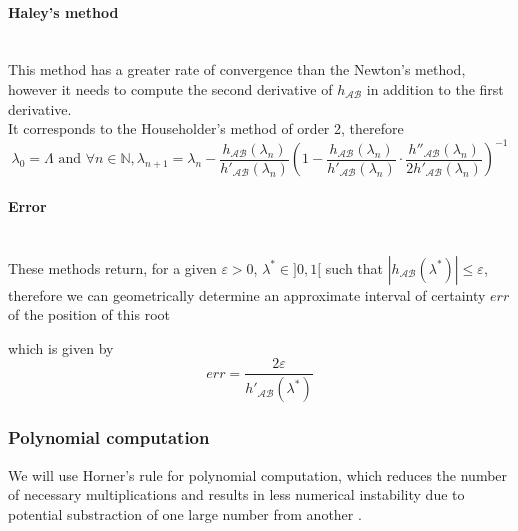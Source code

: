 \documentclass[class=report, float=false, crop=false]{standalone}
\begin{document}
\paragraph{Haley's method}\mbox{}\\

This method has a greater rate of convergence than the Newton's method, however it needs to compute the second derivative of $h_{\mathcal{A}\mathcal{B}}$ in addition to the first derivative.\\

It corresponds to the Householder's method of order 2, therefore
\begin{equation}
\lambda_0 = \Lambda \text{ and } \forall n \in \mathbb{N}, \lambda_{n+1} = \lambda_n - \frac{h_{\mathcal{A}\mathcal{B}}(\lambda_n)}{h'_{\mathcal{A}\mathcal{B}}(\lambda_n)}\left(1 - \frac{h_{\mathcal{A}\mathcal{B}}(\lambda_n)}{h'_{\mathcal{A}\mathcal{B}}(\lambda_n)}\cdot\frac{h''_{\mathcal{A}\mathcal{B}}(\lambda_n)}{2h'_{\mathcal{A}\mathcal{B}}(\lambda_n)}\right)^{-1}
\end{equation}

\paragraph{Error}\mbox{}\\

These methods return, for a given $\varepsilon > 0$, $\lambda^* \in ]0,1[$ such that $|h_{\mathcal{A}\mathcal{B}}(\lambda^*)| \leq \varepsilon$, therefore we can geometrically determine an approximate interval of certainty $err$ of the position of this root

\begin{figure}[h!]
\centering

\end{figure}

which is given by
\begin{equation}
\boxed{
err = \frac{2\varepsilon}{h'_{\mathcal{A}\mathcal{B}}(\lambda^*)}
}
\end{equation}

\subsubsection{Polynomial computation}

We will use Horner's rule for polynomial computation, which reduces the number of necessary multiplications and results in less numerical instability due to potential substraction of one large number from another \cite{horner}.\\
\end{document}
